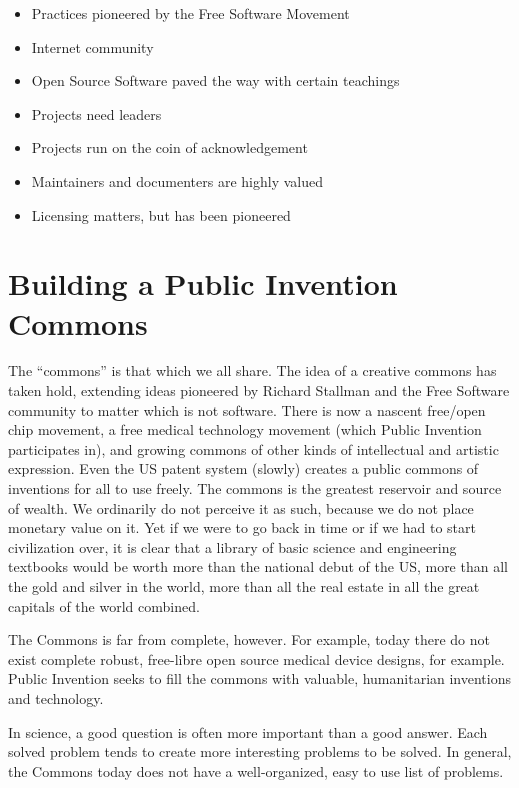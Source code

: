 \documentclass[
	fontsize=10pt, %
	twoside=false, %
	secnumdepth=1, %
]{kaobook}
\begin{document}
\begin{itemize}
\item Practices pioneered by the Free Software Movement
\item Internet community
\item Open Source Software paved the way with certain teachings
\item Projects need leaders
\item Projects run on the coin of acknowledgement
\item Maintainers and documenters are highly valued
\item Licensing matters, but has been pioneered
\end{itemize}

\chapter{Building a Public Invention Commons}

The ``commons'' is that which we all share.
The idea of a creative commons has taken hold,
extending ideas pioneered by Richard Stallman and
the Free Software community to matter which is not
software. There is now a nascent free/open chip
movement, a free medical technology movement
(which Public Invention participates in), and growing
commons of other kinds of intellectual and artistic
expression. Even the US patent system (slowly) creates
a public commons of inventions for all to use freely.
The commons is the greatest reservoir and source of
wealth.
We ordinarily do not perceive it as such, because
we do not place monetary value on it.
Yet if we were to go back in time or if we
had to start civilization over, it is clear that
a library of basic science and engineering textbooks
would be worth more than the national debut of the US,
more than all the gold and silver in the world, more
than all the real estate in all the great capitals
of the world combined.

The Commons is far from complete, however. For example,
today there do not exist complete robust, free-libre
open source medical device designs, for example.
Public Invention seeks to fill the commons with
valuable, humanitarian inventions and technology.

In science, a good question is often more important
than a good answer. Each solved problem tends to create
more interesting problems to be solved.
In general, the Commons today does not have
a well-organized, easy to use list of problems.
\end{document}
